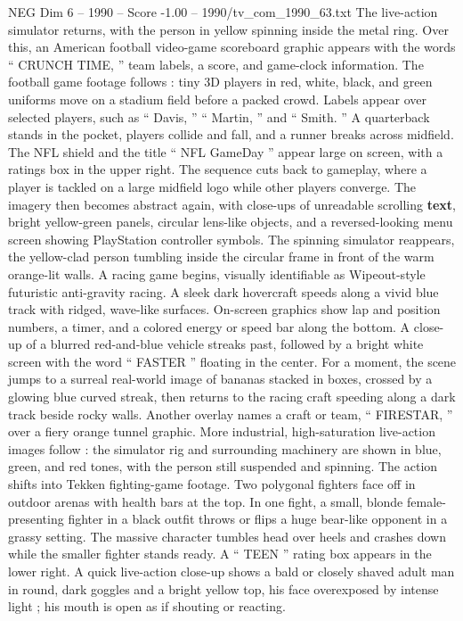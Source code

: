 \begin{textsample}{NEG Dim 6 – 1990 – Score -1.00 – 1990/tv\_com\_1990\_63.txt}
The live-action simulator returns, with the person in yellow spinning inside the metal ring.
Over this, an American football video-game scoreboard graphic appears with the words “ CRUNCH TIME, ” team labels, a score, and game-clock information.
The football game footage follows : tiny 3D players in red, white, black, and green uniforms move on a stadium field before a packed crowd.
Labels appear over selected players, such as “ Davis, ” “ Martin, ” and “ Smith. ” A quarterback stands in the pocket, players collide and fall, and a runner breaks across midfield.
The NFL shield and the title “ NFL GameDay ” appear large on screen, with a ratings box in the upper right.
The sequence cuts back to gameplay, where a player is tackled on a large midfield logo while other players converge.
The imagery then becomes abstract again, with close-ups of unreadable scrolling \textbf{text}, bright yellow-green panels, circular lens-like objects, and a reversed-looking menu screen showing PlayStation controller symbols.
The spinning simulator reappears, the yellow-clad person tumbling inside the circular frame in front of the warm orange-lit walls.
A racing game begins, visually identifiable as Wipeout-style futuristic anti-gravity racing.
A sleek dark hovercraft speeds along a vivid blue track with ridged, wave-like surfaces.
On-screen graphics show lap and position numbers, a timer, and a colored energy or speed bar along the bottom.
A close-up of a blurred red-and-blue vehicle streaks past, followed by a bright white screen with the word “ FASTER ” floating in the center.
For a moment, the scene jumps to a surreal real-world image of bananas stacked in boxes, crossed by a glowing blue curved streak, then returns to the racing craft speeding along a dark track beside rocky walls.
Another overlay names a craft or team, “ FIRESTAR, ” over a fiery orange tunnel graphic.
More industrial, high-saturation live-action images follow : the simulator rig and surrounding machinery are shown in blue, green, and red tones, with the person still suspended and spinning.
The action shifts into Tekken fighting-game footage.
Two polygonal fighters face off in outdoor arenas with health bars at the top.
In one fight, a small, blonde female-presenting fighter in a black outfit throws or flips a huge bear-like opponent in a grassy setting.
The massive character tumbles head over heels and crashes down while the smaller fighter stands ready.
A “ TEEN ” rating box appears in the lower right.
A quick live-action close-up shows a bald or closely shaved adult man in round, dark goggles and a bright yellow top, his face overexposed by intense light ; his mouth is open as if shouting or reacting.

\end{textsample}
